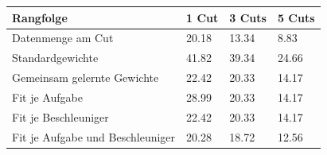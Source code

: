\begin{tabular}{@{}llll@{}}
\toprule
Rangfolge & 1 Cut & 3 Cuts & 5 Cuts \\
\midrule
Datenmenge am Cut & 20.18 & 13.34 & 8.83 \\
Standardgewichte & 41.82 & 39.34 & 24.66 \\
Gemeinsam gelernte Gewichte & 22.42 & 20.33 & 14.17 \\
Fit je Aufgabe & 28.99 & 20.33 & 14.17 \\
Fit je Beschleuniger & 22.42 & 20.33 & 14.17 \\
Fit je Aufgabe und Beschleuniger & 20.28 & 18.72 & 12.56 \\
\bottomrule
\end{tabular}
